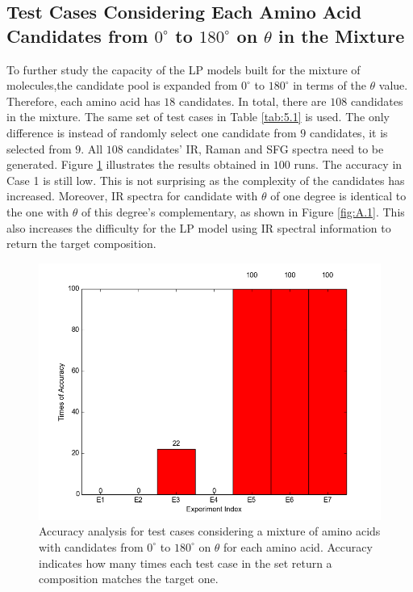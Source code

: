 \subsection{Test Cases Considering Each Amino Acid Candidates from $0^{\circ}$ to $180^{\circ}$ on $\theta$ in the Mixture}
To further study the capacity of the LP models built for the mixture of molecules,the candidate pool is expanded from $0^{\circ}$ to $180^{\circ}$ in terms of the $\theta$ value. Therefore, each amino acid has $18$ candidates. In total, there are $108$ candidates in the mixture. The same set of test cases in Table \ref{tab:5.1} is used. The only difference is instead of randomly select one candidate from $9$ candidates, it is selected from $9$. All $108$ candidates' IR, Raman and SFG spectra need to be generated. Figure \ref{fig:5.3} illustrates the results obtained in $100$ runs. The accuracy in Case 1 is still low. This is not surprising as the complexity of the candidates has increased. Moreover, IR spectra for candidate with $\theta$ of one degree is identical to the one with $\theta$ of this degree's complementary, as shown in Figure \ref{fig:A.1}. This also increases the difficulty for the LP model using IR spectral information to return the target composition. \\

\begin{figure}[!ht]
\centering
\includegraphics[scale=0.7]{Figures/accuracy_pecent_result10_mixture.png}
\caption{Accuracy analysis for test cases considering a mixture of amino acids with candidates from $0^{\circ}$ to $180^{\circ}$ on $\theta$ for each amino acid. Accuracy indicates how many times each test case in the set return a composition matches the target one.} \label{fig:5.3}
\end{figure}

